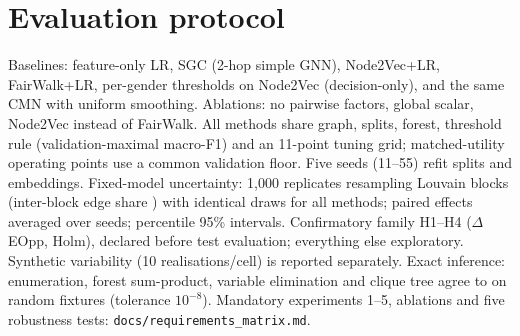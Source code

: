 \documentclass[11pt,a4paper]{article}
\begin{document}
\section{Evaluation protocol}
Baselines: feature-only LR, SGC (2-hop simple GNN), Node2Vec+LR, FairWalk+LR, per-gender thresholds on Node2Vec (decision-only), and the same CMN with uniform smoothing. Ablations: no pairwise factors, global scalar, Node2Vec instead of FairWalk. All methods share graph, splits, forest, threshold rule (validation-maximal macro-F1) and an 11-point tuning grid; matched-utility operating points use a common validation floor. Five seeds (11--55) refit splits and embeddings. Fixed-model uncertainty: 1{,}000 replicates resampling \RNBlocks{} Louvain blocks (inter-block edge share \RInterblockShare) with identical draws for all methods; paired effects averaged over seeds; percentile 95\% intervals. Confirmatory family H1--H4 ($\Delta$EOpp, Holm), declared before test evaluation; everything else exploratory. Synthetic variability (10 realisations/cell) is reported separately. Exact inference: enumeration, forest sum-product, variable elimination and clique tree agree to \RInfMaxErr{} on \RInfFixtures{} random fixtures (tolerance $10^{-8}$). Mandatory experiments 1--5, ablations and five robustness tests: \texttt{docs/requirements\_matrix.md}.
\end{document}
